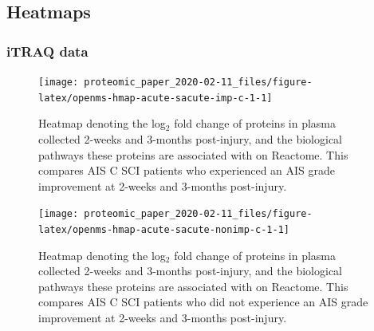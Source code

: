 \documentclass[9pt,lineno]{elife}
\newcommand{\blandscape}{\begin{landscape}}
\newcommand{\elandscape}{\end{landscape}}
\begin{document}
\begin{landscape}
\begin{landscape}
\hypertarget{sup-heatmaps}{%
\subsection{Heatmaps}\label{sup-heatmaps}}

\hypertarget{itraq-data}{%
\subsubsection{iTRAQ data}\label{itraq-data}}

\begin{landscape}



\begin{figure}

{\centering \texttt{[image: proteomic\_paper\_2020-02-11\_files/figure-latex/openms-hmap-acute-sacute-imp-c-1-1]} 

}

\caption[Heatmap - iTRAQ - Acute C Improvers VS Subacute Improvers]{Heatmap denoting the log\(_2\) fold change of proteins in plasma collected 2-weeks and 3-months post-injury, and the biological pathways these proteins are associated with on Reactome. This compares AIS C SCI patients who experienced an AIS grade improvement at 2-weeks and 3-months post-injury.}\label{fig:openms-hmap-acute-sacute-imp-c-1}
\end{figure}

\elandscape
\blandscape



\begin{figure}

{\centering \texttt{[image: proteomic\_paper\_2020-02-11\_files/figure-latex/openms-hmap-acute-sacute-nonimp-c-1-1]} 

}

\caption[Heatmap - iTRAQ - Acute Non-Improvers VS Subacute Non-Improvers]{Heatmap denoting the log\(_2\) fold change of proteins in plasma collected 2-weeks and 3-months post-injury, and the biological pathways these proteins are associated with on Reactome. This compares AIS C SCI patients who did not experience an AIS grade improvement at 2-weeks and 3-months post-injury.}\label{fig:openms-hmap-acute-sacute-nonimp-c-1}
\end{figure}

\elandscape
\blandscape



\begin{figure}


\end{figure}
\end{landscape}
\end{landscape}
\end{landscape}
\end{document}
